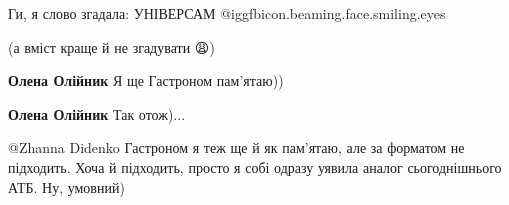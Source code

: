  
 
 
 
 
 
Ги, я слово згадала: УНІВЕРСАМ  @igg{fbicon.beaming.face.smiling.eyes} 

 
(а вміст краще й не згадувати 😩)

 
\textbf{Олена Олійник} Я ще Гастроном пам'ятаю))

 
\textbf{Олена Олійник}
Так отож)...

 
@Zhanna Didenko
Гастроном я теж ще й як пам'ятаю, але за форматом не підходить. Хоча й підходить, просто я собі одразу уявила аналог сьогоднішнього АТБ. Ну, умовний)

 

